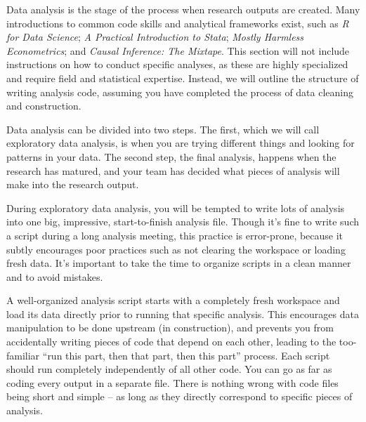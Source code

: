 Data analysis is the stage of the process when research outputs are created. 
Many introductions to common code skills and analytical frameworks exist, such as
\textit{R for Data Science};
\textit{A Practical Introduction to Stata};
\textit{Mostly Harmless Econometrics}; and
\textit{Causal Inference: The Mixtape}.
This section will not include instructions on how to conduct specific analyses,
as these are highly specialized and require field and statistical expertise.
Instead, we will outline the structure of writing analysis code,
assuming you have completed the process of data cleaning and construction.

Data analysis can be divided into two steps. 
The first, which we will call exploratory data analysis, 
is when you are trying different things and looking for patterns in your data. 
The second step, the final analysis,
happens when the research has matured,
and your team has decided what pieces of analysis will make into the research output.

During exploratory data analysis,
you will be tempted to write lots of analysis 
into one big, impressive, start-to-finish analysis file. 
Though it's fine to write such a script during a long analysis meeting, 
this practice is error-prone, 
because it subtly encourages poor practices such as 
not clearing the workspace or loading fresh data. 
It's important to take the time to organize scripts in a clean manner and to avoid mistakes.

A well-organized analysis script starts with 
a completely fresh workspace and load its data directly
prior to running that specific analysis.
This encourages data manipulation to be done upstream (in construction),
and prevents you from accidentally writing pieces of code
that depend on each other, leading to the too-familiar
``run this part, then that part, then this part'' process.
Each script should run completely independently of all other code.
You can go as far as coding every output in a separate file.
There is nothing wrong with code files being short and simple --
as long as they directly correspond to specific pieces of analysis.

